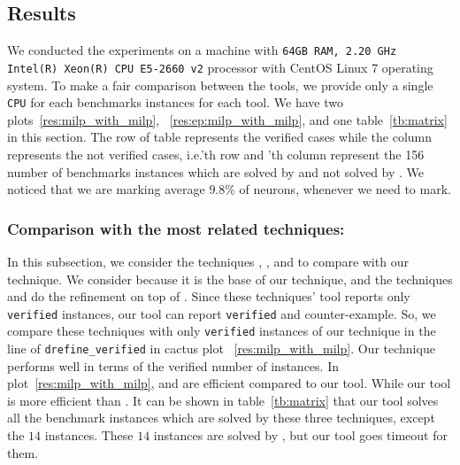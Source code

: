 \subsection{Results}
We conducted the experiments on a machine with \texttt{64GB RAM, 2.20 GHz Intel(R) Xeon(R) CPU E5-2660 v2}
processor with CentOS Linux 7 operating system. 
To make a fair comparison between the tools, we provide only a single \texttt{CPU} for each benchmarks instances for each tool. 
We have two plots~\ref{res:milp_with_milp}, ~\ref{res:ep:milp_with_milp}, and one
table~\ref{tb:matrix} in this section. The row of table represents the verified cases while the column
represents the not verified cases, i.e.\kpoly{}'th row and \deeppoly{}'th column represent the 
156 number of benchmarks instances which are solved by \kpoly{} and not solved by \deeppoly{}. 
We noticed that we are marking average $9.8\%$ of neurons, whenever we need to mark.     

\subsubsection{Comparison with the most related techniques:}
In this subsection, we consider the techniques \deeppoly{}, \kpoly{}, and \deepsrgr{} to compare with
our technique. 
We consider \deeppoly{} because it is the base of our technique,  
and the techniques \kpoly{} and \deepsrgr{} do the refinement on top of \deeppoly{}.
Since these techniques' tool reports only \texttt{verified} instances, our tool can report 
\texttt{verified} and counter-example.  
So, we compare these techniques with only \texttt{verified} 
instances of our technique in the line of \texttt{drefine\_verified} in cactus plot ~\ref{res:milp_with_milp}. 
Our technique performs well in terms of the verified number of instances. 
In plot~\ref{res:milp_with_milp}, \deeppoly{} and \kpoly{} are efficient compared to our tool. 
While our tool is more efficient than \deepsrgr{}. 
It can be shown in table~\ref{tb:matrix} that our tool solves all the benchmark instances 
which are solved by these three techniques, except 
the $14$ instances. These $14$ instances are solved by \kpoly{}, but our tool goes timeout for them. 

